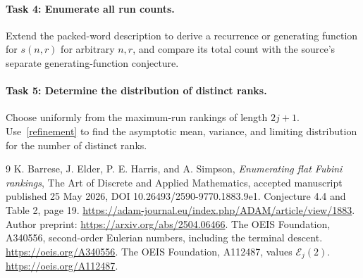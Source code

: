 \documentclass[11pt]{article}
\newcommand{\E}{\mathcal E}
\begin{document}
\paragraph{Task 4: Enumerate all run counts.}
Extend the packed-word description to derive a recurrence or generating
function for \(s(n,r)\) for arbitrary \(n,r\), and compare its total
count with the source's separate generating-function conjecture.

\paragraph{Task 5: Determine the distribution of distinct ranks.}
Choose uniformly from the maximum-run rankings of length \(2j+1\).
Use~\eqref{refinement} to find the asymptotic mean, variance, and
limiting distribution for the number of distinct ranks.

\begin{thebibliography}{9}
K. Barrese, J. Elder, P. E. Harris, and A. Simpson,
\emph{Enumerating flat Fubini rankings},
The Art of Discrete and Applied Mathematics, accepted manuscript
published 25 May 2026, DOI 10.26493/2590-9770.1883.9e1.
Conjecture 4.4 and Table 2, page 19.
\url{https://adam-journal.eu/index.php/ADAM/article/view/1883}.
Author preprint: \url{https://arxiv.org/abs/2504.06466}.
The OEIS Foundation, A340556, second-order Eulerian numbers,
including the terminal descent.
\url{https://oeis.org/A340556}.
The OEIS Foundation, A112487, values \(\E_j(2)\).
\url{https://oeis.org/A112487}.
\end{thebibliography}
\end{document}
